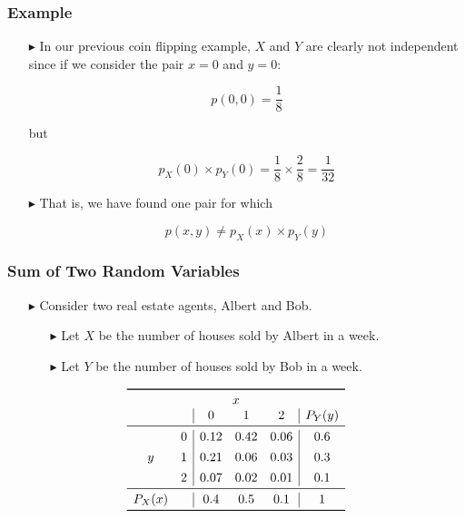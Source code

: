 \documentclass[12pt]{beamer}
\begin{document}
\begin{frame}
	\frametitle{Example}
	
	\begin{itemize}
		\item[\color{blue}$\blacktriangleright$]In our previous coin flipping example, $X$ and $Y$ are clearly not independent since if we consider the pair $x = 0$ and $y = 0$:
		
		\[
		p(0,0) = \frac{1}{8}
		\]
		
		but
		
		\[
		p_X(0) \times p_Y(0) = \frac{1}{8} \times \frac{2}{8} = \frac{1}{32}
		\]
		
		\item[\color{blue}$\blacktriangleright$]That is, we have found one pair for which
		
		\[
		p(x,y) \neq p_X(x) \times p_Y(y)
		\]
		
	\end{itemize}
	
\end{frame}
\begin{frame}
	\frametitle{Sum of Two Random Variables}
	
	\begin{itemize}
		\item[\color{blue}$\blacktriangleright$] Consider two real estate agents, Albert and Bob.
		\begin{itemize}
		\item[\color{blue}$\blacktriangleright$]Let $X$ be the number of houses sold by Albert in a week.
		\item[\color{blue}$\blacktriangleright$]Let $Y$ be the number of houses sold by Bob in a week.
			\end{itemize}
	\end{itemize}
	
\[
\begin{array}{cc|ccc|c}
	\toprule
	\multicolumn{6}{c}{x}\\
	&& 0 & 1 & 2 &P_Y(y) \\
	\midrule
	&0 & 0.12 & 0.42 & 0.06 & 0.6\\[1ex]
	y&1 & 0.21 & 0.06& 0.03 & 0.3\\[1ex]
	&2 & 0.07& 0.02 & 0.01 & 0.1 \\
	\midrule
	P_X(x)&&0.4& 0.5& 0.1& 1 \\
	\bottomrule
\end{array}
\]
	
\end{frame}
\end{document}
